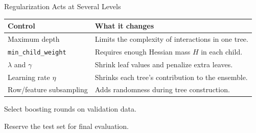 \begin{frame}{Regularization Acts at Several Levels}
  \centering
  \small\renewcommand{\arraystretch}{1.15}
  \begin{tabular}{>{\raggedright\arraybackslash}p{4.1cm}>{\raggedright\arraybackslash}p{8.0cm}}
    \toprule
    Control & What it changes\\ \midrule
    Maximum depth & Limits the complexity of interactions in one tree.\\
    \texttt{min\_child\_weight} & Requires enough Hessian mass $H$ in each child.\\
    $\lambda$ and $\gamma$ & Shrink leaf values and penalize extra leaves.\\
    Learning rate $\eta$ & Shrinks each tree's contribution to the ensemble.\\
    Row/feature subsampling & Adds randomness during tree construction.\\ \bottomrule
  \end{tabular}
  \vspace{.4cm}
  \normalsize\par Select boosting rounds on validation data.\par
  Reserve the test set for final evaluation.
\end{frame}
